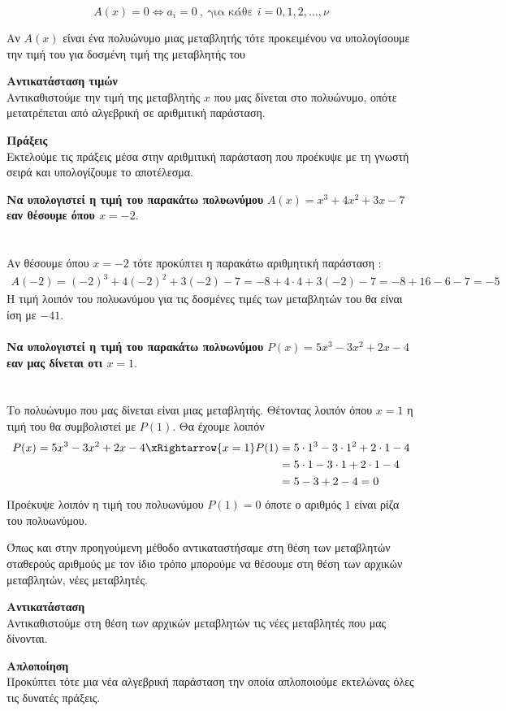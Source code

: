 \[ A(x)=0\Leftrightarrow a_i=0 \ ,\ \textrm{για κάθε }i=0,1,2,\ldots,\nu\]
\newpage
\noindent
\Lymena
\begin{Methodos}{5cm}
Αν $ A(x) $ είναι ένα πολυώνυμο μιας μεταβλητής τότε προκειμένου να υπολογίσουμε την τιμή του για δοσμένη τιμή της μεταβλητής του
\begin{bhma}
\item \textbf{Αντικατάσταση τιμών}\\
Αντικαθιστούμε την τιμή της μεταβλητής $ x $ που μας δίνεται στο πολυώνυμο, οπότε μετατρέπεται από αλγεβρική σε αριθμιτική παράσταση.
\item \textbf{Πράξεις}\\
Εκτελούμε τις πράξεις μέσα στην αριθμιτική παράσταση που προέκυψε με τη γνωστή σειρά και υπολογίζουμε το αποτέλεσμα.
\end{bhma}
\end{Methodos}
\textbf{Να υπολογιστεί η τιμή του παρακάτω πολυωνύμου}
{\boldmath  $ A(x)=x^3+4x^2+3x-7 $}
\textbf{εαν θέσουμε όπου {\boldmath$ x=-2 $}}.\\\\
\lysh\\
Αν θέσουμε όπου $ x=-2$ τότε προκύπτει η παρακάτω αριθμητική παράσταση :
\begin{align*}
A(-2)=(-2)^3+4(-2)^2+3(-2)-7=-8+4\cdot 4+3(-2)-7=-8+16-6-7=-5
\end{align*}
Η τιμή λοιπόν του πολυωνύμου για τις δοσμένες τιμές των μεταβλητών του θα είναι ίση με $ -41 $.\\\\
\textbf{Να υπολογιστεί η τιμή του παρακάτω πολυωνύμου}
{\boldmath $ P(x)=5x^3-3x^2+2x-4 $}
\textbf{εαν μας δίνεται οτι {\boldmath$ x=1$}}.\\\\
\lysh\\
Το πολυώνυμο που μας δίνεται είναι μιας μεταβλητής. Θέτοντας λοιπόν όπου $ x=1 $ η τιμή του θα συμβολιστεί με $ P(1) $. Θα έχουμε λοιπόν
\begin{align*} P(x)=5x^3-3x^2+2x-4\xRightarrow{x=1}P(1)&=5\cdot 1^3-3\cdot1^2+2\cdot1-4\\
&=5\cdot 1-3\cdot1+2\cdot1-4\\
&=5-3+2-4=0 
\end{align*}
Προέκυψε λοιπόν η τιμή του πολυωνύμου $ P(1)=0 $ όποτε ο αριθμός $ 1 $ είναι ρίζα του πολυωνύμου.
\begin{Methodos}{5cm}
Όπως και στην προηγούμενη μέθοδο αντικαταστήσαμε στη θέση των μεταβλητών σταθερούς αριθμούς με τον ίδιο τρόπο μπορούμε να θέσουμε στη θέση των αρχικών μεταβλητών, νέες μεταβλητές.
\begin{bhma}
\item \textbf{Αντικατάσταση}\\
Αντικαθιστούμε στη θέση των αρχικών μεταβλητών τις νέες μεταβλητές που μας δίνονται.
\item \textbf{Απλοποίηση}\\
Προκύπτει τότε μια νέα αλγεβρική παράσταση την οποία απλοποιούμε εκτελώνας όλες τις δυνατές πράξεις.
\end{bhma}
\end{Methodos}
